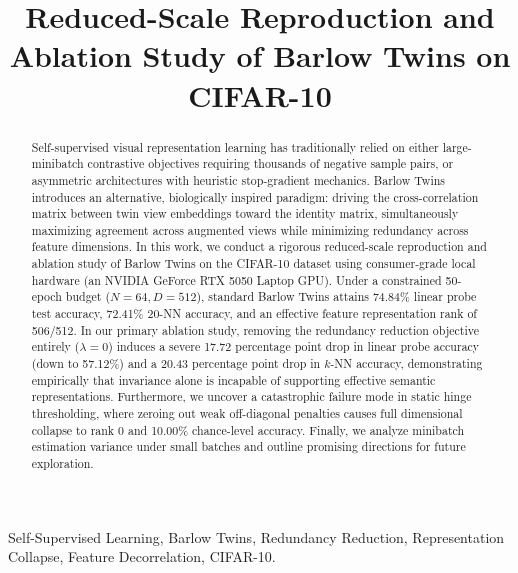 \documentclass[conference]{IEEEtran}
\begin{document}
\title{Reduced-Scale Reproduction and Ablation Study of Barlow Twins on CIFAR-10}

\author{
}

\maketitle

\begin{abstract}
Self-supervised visual representation learning has traditionally relied on either large-minibatch contrastive objectives requiring thousands of negative sample pairs, or asymmetric architectures with heuristic stop-gradient mechanics. Barlow Twins introduces an alternative, biologically inspired paradigm: driving the cross-correlation matrix between twin view embeddings toward the identity matrix, simultaneously maximizing agreement across augmented views while minimizing redundancy across feature dimensions. In this work, we conduct a rigorous reduced-scale reproduction and ablation study of Barlow Twins on the CIFAR-10 dataset using consumer-grade local hardware (an NVIDIA GeForce RTX 5050 Laptop GPU). Under a constrained 50-epoch budget ($N=64, D=512$), standard Barlow Twins attains 74.84\% linear probe test accuracy, 72.41\% 20-NN accuracy, and an effective feature representation rank of 506/512. In our primary ablation study, removing the redundancy reduction objective entirely ($\lambda=0$) induces a severe 17.72 percentage point drop in linear probe accuracy (down to 57.12\%) and a 20.43 percentage point drop in $k$-NN accuracy, demonstrating empirically that invariance alone is incapable of supporting effective semantic representations. Furthermore, we uncover a catastrophic failure mode in static hinge thresholding, where zeroing out weak off-diagonal penalties causes full dimensional collapse to rank 0 and 10.00\% chance-level accuracy. Finally, we analyze minibatch estimation variance under small batches and outline promising directions for future exploration.
\end{abstract}

\begin{IEEEkeywords}
Self-Supervised Learning, Barlow Twins, Redundancy Reduction, Representation Collapse, Feature Decorrelation, CIFAR-10.
\end{IEEEkeywords}
\end{document}
